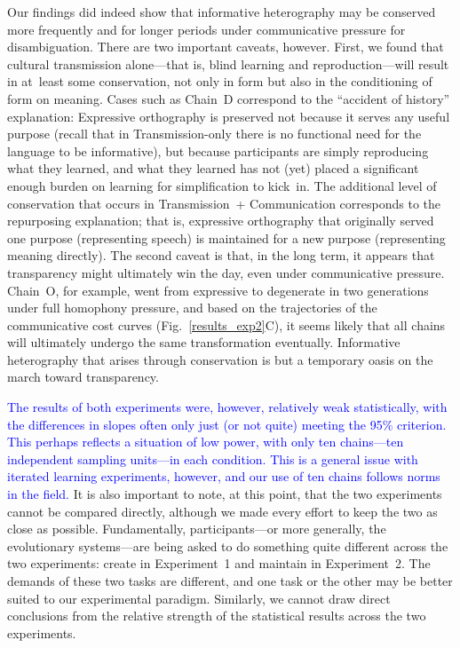 \documentclass[doc,biblatex]{apa7}
\newcommand\newmaterial[1]{\textcolor{blue}{#1}}
\begin{document}
Our findings did indeed show that informative heterography may be conserved more frequently and for longer periods under communicative pressure for disambiguation. There are two important caveats, however. First, we found that cultural transmission alone---that is, blind learning and reproduction---will result in at~least some conservation, not only in form but also in the conditioning of form on meaning. Cases such as Chain~D correspond to the ``accident of history'' explanation: Expressive orthography is preserved not because it serves any useful purpose (recall that in Transmission-only there is no functional need for the language to be informative), but because participants are simply reproducing what they learned, and what they learned has not (yet) placed a significant enough burden on learning for simplification to kick~in. The additional level of conservation that occurs in Transmission~+ Communication corresponds to the repurposing explanation; that is, expressive orthography that originally served one purpose (representing speech) is maintained for a new purpose (representing meaning directly). The second caveat is that, in the long term, it appears that transparency might ultimately win the day, even under communicative pressure. Chain~O, for example, went from expressive to degenerate in two generations under full homophony pressure, and based on the trajectories of the communicative cost curves (Fig.~\ref{results_exp2}C), it seems likely that all chains will ultimately undergo the same transformation eventually. Informative heterography that arises through conservation is but a temporary oasis on the march toward transparency.

\newmaterial{The results of both experiments were, however, relatively weak statistically, with the differences in slopes often only just (or not quite) meeting the 95\% criterion. This perhaps reflects a situation of low power, with only ten chains---ten independent sampling units---in each condition. This is a general issue with iterated learning experiments, however, and our use of ten chains follows norms in the field.} It is also important to note, at this point, that the two experiments cannot be compared directly, although we made every effort to keep the two as close as possible. Fundamentally, participants---or more generally, the evolutionary systems---are being asked to do something quite different across the two experiments: create in Experiment~1 and maintain in Experiment~2. The demands of these two tasks are different, and one task or the other may be better suited to our experimental paradigm. Similarly, we cannot draw direct conclusions from the relative strength of the statistical results across the two experiments.
\end{document}
